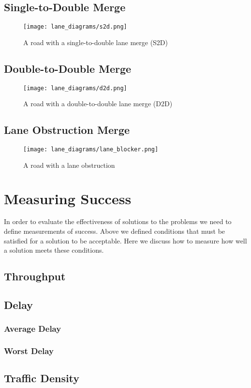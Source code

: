 \subsection{Single-to-Double Merge}
\label{subsec:Single-to-Double Merge}

\begin{figure}[htb]
\texttt{[image: lane\_diagrams/s2d.png]}
\caption{A road with a single-to-double lane merge (S2D)}
\label{fig:S2DMerge}
\end{figure}


\subsection{Double-to-Double Merge}
\label{subsec:Double-to-Double Merge}

\begin{figure}[htb]
\texttt{[image: lane\_diagrams/d2d.png]}
\caption{A road with a double-to-double lane merge (D2D)}
\label{fig:D2DMerge}
\end{figure}

\subsection{Lane Obstruction Merge}
\label{subsec:Lane Obstruction Merge}

\begin{figure}[htb]
\texttt{[image: lane\_diagrams/lane\_blocker.png]}
\caption{A road with a lane obstruction}
\label{fig:LaneObstruction}
\end{figure}

\section{Measuring Success}
\label{sec:Measuring Success}
In order to evaluate the effectiveness of solutions to the problems we need to define measurements of success. Above we defined conditions that must be satisfied for a solution to be acceptable. Here we discuss how to measure how well a solution meets these conditions.

\subsection{Throughput}
\label{subsec:Throughput}

\subsection{Delay}
\label{subsec:Delay}

\subsubsection{Average Delay}
\label{subsubsec:Average Delay}

\subsubsection{Worst Delay}
\label{subsubsec:Average Delay}

\subsection{Traffic Density}
\label{subsec:Traffic Density}